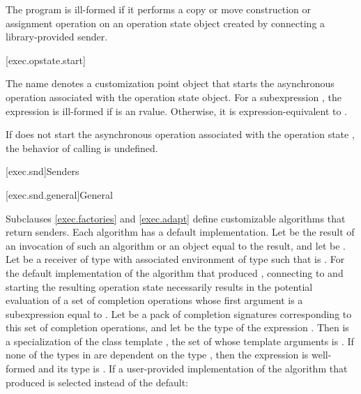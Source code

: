 \pnum
The program is ill-formed
if it performs a copy or move construction or assignment operation on
an operation state object created by connecting a library-provided sender.

[exec.opstate.start]{}

\pnum
The name  denotes a customization point object
that starts
the asynchronous operation associated with the operation state object.
For a subexpression ,
the expression  is ill-formed
if  is an rvalue.
Otherwise, it is expression-equivalent to
.

\pnum
If  does not start
the asynchronous operation associated with the operation state ,
the behavior of calling  is undefined.

[exec.snd]{Senders}

[exec.snd.general]{General}

\pnum
Subclauses \ref{exec.factories} and \ref{exec.adapt} define
customizable algorithms that return senders.
Each algorithm has a default implementation.
Let  be the result of an invocation of such an algorithm or
an object equal to the result, and
let  be .
Let  be a receiver of type 
with associated environment  of type 
such that  is .
For the default implementation of the algorithm that produced ,
connecting  to  and
starting the resulting operation state
necessarily results in the potential evaluation of
a set of completion operations
whose first argument is a subexpression equal to .
Let  be a pack of completion signatures corresponding to
this set of completion operations, and
let  be
the type of the expression .
Then  is
a specialization of
the class template ,
the set of whose template arguments is .
If none of the types in  are dependent on the type , then
the expression  is well-formed and
its type is .
If a user-provided implementation of the algorithm
that produced  is selected instead of the default:

